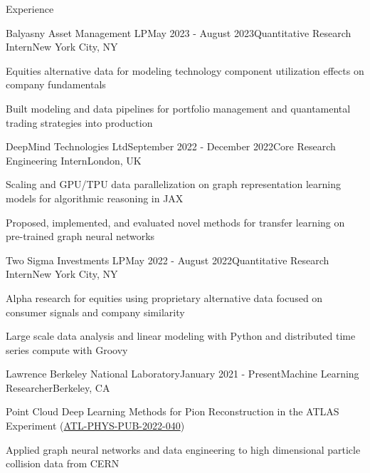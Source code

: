 \documentclass{resume} %
\begin{document}
\begin{rSection}{Experience}

\begin{rSubsection}{Balyasny Asset Management LP}{May 2023 - August 2023}{Quantitative Research Intern}{New York City, NY}
    \item Equities alternative data for modeling technology component utilization effects on company fundamentals
    \item Built modeling and data pipelines for portfolio management and quantamental trading strategies into production
\end{rSubsection}

\begin{rSubsection}{DeepMind Technologies Ltd}{September 2022 - December 2022}{Core Research Engineering Intern}{London, UK}
    \item Scaling and GPU/TPU data parallelization on graph representation learning models for algorithmic reasoning in JAX
    \item Proposed, implemented, and evaluated novel methods for transfer learning on pre-trained graph neural networks
\end{rSubsection}

\begin{rSubsection}{Two Sigma Investments LP}{May 2022 - August 2022}{Quantitative Research Intern}{New York City, NY}
     \item Alpha research for equities using proprietary alternative data focused on consumer signals and company similarity
     \item Large scale data analysis and linear modeling with Python and distributed time series compute with Groovy
\end{rSubsection}

\begin{rSubsection}{Lawrence Berkeley National Laboratory}{January 2021 - Present}{Machine Learning Researcher}{Berkeley, CA}
    \item Point Cloud Deep Learning Methods for Pion Reconstruction in the ATLAS Experiment (\href{https://cds.cern.ch/record/2825379/files/ATL-PHYS-PUB-2022-040.pdf}{ATL-PHYS-PUB-2022-040})    
    \item Applied graph neural networks and data engineering to high dimensional particle collision data from CERN
\end{rSubsection}


\end{rSection}
\end{document}
